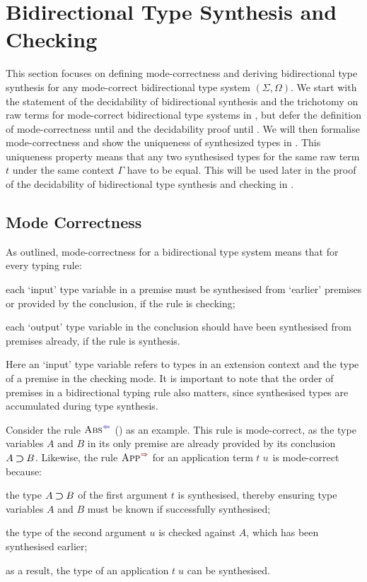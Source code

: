 
\section{Bidirectional Type Synthesis and Checking} \label{sec:type-synthesis}
This section focuses on defining mode-correctness and deriving bidirectional type synthesis for any mode-correct bidirectional type system $(\Sigma, \Omega)$.
We start with the statement of the decidability of bidirectional synthesis and the trichotomy on raw terms for mode-correct bidirectional type systems in , but defer the definition of mode-correctness until  and the decidability proof until .
We will then formalise mode-correctness and show the uniqueness of synthesized types in .
This uniqueness property means that any two synthesised types for the same raw term $t$ under the same context $\Gamma$ have to be equal.
This will be used later in the proof of the decidability of bidirectional type synthesis and checking in .


\subsection{Mode Correctness}\label{sec:mode-correctness}
As \citet{Dunfield2021} outlined, mode-correctness for a bidirectional type system means that for every typing rule:
\begin{enumerate*}
\item each `input' type variable in a premise must be synthesised from `earlier' premises or provided by the conclusion, if the rule is checking;
\item each `output' type variable in the conclusion should have been synthesised from premises already, if the rule is synthesis.
\end{enumerate*}
Here an `input' type variable refers to types in an extension context and the type of a premise in the checking mode.
It is important to note that the order of premises in a bidirectional typing rule also matters, since synthesised types are accumulated during type synthesis.

Consider the rule $\ChkRule{Abs}$ () as an example.
This rule is mode-correct, as the type variables $A$ and $B$ in its only premise are already provided by its conclusion $A \mathbin{\bm{\supset}} B$.
Likewise, the rule $\SynRule{App}$ for an application term $\isTerm{t\;u}$ is mode-correct because:
\begin{enumerate*}
\item the type $A \mathbin{\bm{\supset}} B$ of the first argument $t$ is synthesised, thereby ensuring type variables $A$ and $B$ must be known if successfully synthesised;
\item the type of the second argument $u$ is checked against $A$, which has been synthesised earlier;
\item as a result, the type of an application $t\;u$ can be synthesised.
\end{enumerate*}

